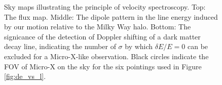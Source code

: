 \documentclass[aps,prd,10pt,twocolumn,superscriptaddress,showpacs]{revtex4-1}
\begin{document}
\begin{figure}[h!]
\begin{subfigure}[b]{1.0\columnwidth}
\end{subfigure}
\caption{Sky maps illustrating the principle of velocity spectroscopy. Top: The flux map. Middle:
	The dipole pattern in the line energy induced by our motion relative to the Milky Way halo.
	Bottom: The signicance of the detection of Doppler shifting of a dark matter decay line,
indicating the number of $\sigma$ by which $\delta E/E=0$ can be excluded for a Micro-X-like
observation. Black circles indicate the
FOV of Micro-X on the sky for the six pointings used in Figure \ref{fig:de_vs_l}. }
\label{fig:skymaps}
\end{figure}



\end{document}
